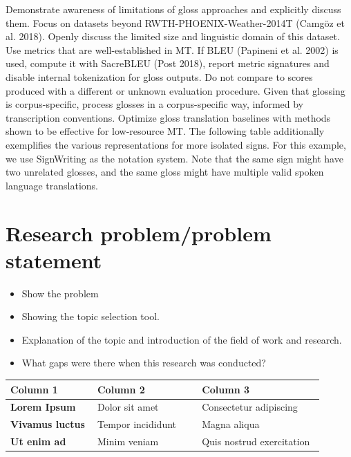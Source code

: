 Demonstrate awareness of limitations of gloss approaches and explicitly discuss them.
Focus on datasets beyond RWTH-PHOENIX-Weather-2014T (Camgöz et al. 2018).
Openly discuss the limited size and linguistic domain of this dataset.
Use metrics that are well-established in MT. If BLEU (Papineni et al. 2002) is used,
compute it with SacreBLEU (Post 2018), report metric signatures and disable internal
tokenization for gloss outputs. Do not compare to scores produced with a different or
unknown evaluation procedure.
Given that glossing is corpus-specific, process glosses in a corpus-specific way, informed
by transcription conventions.
Optimize gloss translation baselines with methods shown to be effective for low-resource
MT.
The following table additionally exemplifies the various representations for more isolated signs.
For this example, we use SignWriting as the notation system. Note that the same sign might have
two unrelated glosses, and the same gloss might have multiple valid spoken language translations.


\section{Research problem/problem statement}
\begin{itemize}
	\item Show the problem
	\item Showing the topic selection tool.
	\item Explanation of the topic and introduction of the field of work and research.
	\item What gaps were there when this research was conducted?
\end{itemize}

\begin{table}[h]
    \begin{tabular}{|>{\bfseries}p{0.25\linewidth} | p{0.30\linewidth} | p{0.35\linewidth}|}
        \hline
        Column 1 &  \textbf{Column 2} &  \textbf{Column 3}\\ 
        \hline
        Lorem Ipsum   & Dolor sit amet    & Consectetur adipiscing\\ 
        \hline
        Vivamus luctus& Tempor incididunt & Magna aliqua\\ 
        \hline
        Ut enim ad    & Minim veniam      & Quis nostrud exercitation\\ 
        \hline
    \end{tabular}
    \label{tab:1-1}
\end{table}
